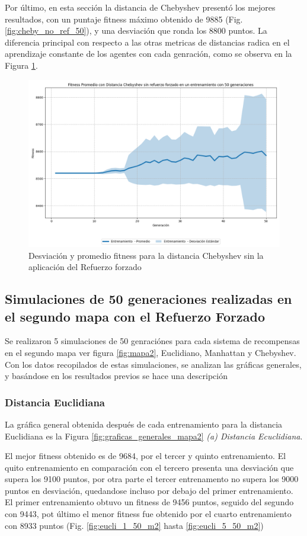 \documentclass[conference]{IEEEtran}
\begin{document}
Por último, en esta sección la distancia de Chebyshev presentó los mejores resultados, con un puntaje fitness máximo obtenido de 9885 (Fig. \ref{fig:cheby_no_ref_50}), y una desviación que ronda los 8800 puntos. La diferencia principal con respecto a las otras metricas de distancias radica en el aprendizaje constante de los agentes con cada genración, como se observa en la Figura \ref{fig:no_refoice_chy_desv}.
\begin{figure}[H]
    \centering
    \includegraphics[width=0.9\linewidth]{Sin_Refuerzo_50Gen/Cheby_NoRef_50Gen_Sombra.png}
    \caption{Desviación y promedio fitness para la distancia Chebyshev sin la aplicación del Refuerzo forzado}
    \label{fig:no_refoice_chy_desv}
\end{figure}

\subsection{Simulaciones de 50 generaciones realizadas en el segundo mapa con el Refuerzo Forzado}
Se realizaron 5 simulaciones de 50 genraciónes para cada sistema de recompensas en el segundo mapa ver figura \ref{fig:mapa2}, Euclidiano, Manhattan y Chebyshev. Con los datos recopilados de estas simulaciones, se analizan las gráficas generales, y basándose en los resultados previos se hace una descripción

\subsubsection{Distancia Euclidiana}
La gráfica general obtenida después de cada entrenamiento para la distancia Euclidiana es la Figura \ref{fig:graficas_generales_mapa2} \textit{(a) Distancia Ecuclidiana}.

El mejor fitness obtenido es de 9684, por el tercer y quinto entrenamiento. El quito entrenamiento en comparación con el tercero presenta una desviación que supera los 9100 puntos, por otra parte el tercer entrenamento no supera los 9000 puntos en desviación, quedandose incluso por debajo del primer entrenamiento. El primer entrenamiento obtuvo un fitness de 9456 puntos, seguido del segundo con 9443, pot último el menor fitness fue obtenido por el cuarto entrenamiento con 8933 puntos (Fig. \ref{fig:eucli_1_50_m2} hasta \ref{fig:eucli_5_50_m2})
\end{document}

